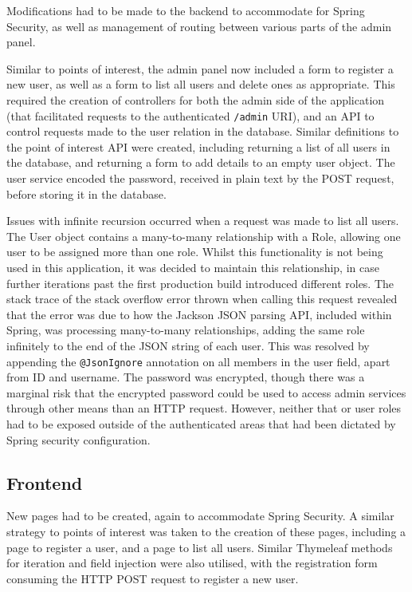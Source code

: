 Modifications had to be made to the backend to accommodate for Spring Security, as well as management of routing between various parts of the admin panel.

Similar to points of interest, the admin panel now included a form to register a new user, as well as a form to list all users and delete ones as appropriate. This required the creation of controllers for both the admin side of the application (that facilitated requests to the authenticated \texttt{/admin} URI), and an API to control requests made to the user relation in the database. Similar definitions to the point of interest API were created, including returning a list of all users in the database, and returning a form to add details to an empty user object. The user service encoded the password, received in plain text by the POST request, before storing it in the database.

Issues with infinite recursion occurred when a request was made to list all users. The User object contains a many-to-many relationship with a Role, allowing one user to be assigned more than one role. Whilst this functionality is not being used in this application, it was decided to maintain this relationship, in case further iterations past the first production build introduced different roles. The stack trace of the stack overflow error thrown when calling this request revealed that the error was due to how the Jackson JSON parsing API, included within Spring, was processing many-to-many relationships, adding the same role infinitely to the end of the JSON string of each user. This was resolved by appending the \texttt{@JsonIgnore} annotation on all members in the user field, apart from ID and username. The password was encrypted, though there was a marginal risk that the encrypted password could be used to access admin services through other means than an HTTP request. However, neither that or user roles had to be exposed outside of the authenticated areas that had been dictated by Spring security configuration.

\subsection{Frontend}

New pages had to be created, again to accommodate Spring Security. A similar strategy to points of interest was taken to the creation of these pages, including a page to register a user, and a page to list all users. Similar Thymeleaf methods for iteration and field injection were also utilised, with the registration form consuming the HTTP POST request to register a new user.

